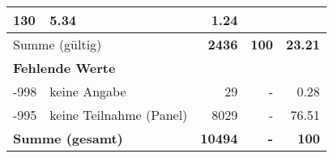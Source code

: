 \begin{longtable}{lXrrr}
       \num{130} &
       \num[round-mode=places,round-precision=2]{5.34} &
         \num[round-mode=places,round-precision=2]{1.24} \\
     \midrule
     \multicolumn{2}{l}{Summe (gültig)} &
       \textbf{\num{2436}} &
     \textbf{\num{100}} &
       \textbf{\num[round-mode=places,round-precision=2]{23.21}} \\
     \multicolumn{5}{l}{\textbf{Fehlende Werte}}\\
       -998 &
       keine Angabe &
         \num{29} &
        - &
         \num[round-mode=places,round-precision=2]{0.28} \\
       -995 &
       keine Teilnahme (Panel) &
         \num{8029} &
        - &
         \num[round-mode=places,round-precision=2]{76.51} \\
     \midrule
     \multicolumn{2}{l}{\textbf{Summe (gesamt)}} &
          \textbf{\num{10494}} &
        \textbf{-} &
        \textbf{\num{100}} \\
     \bottomrule
     \end{longtable}
     
